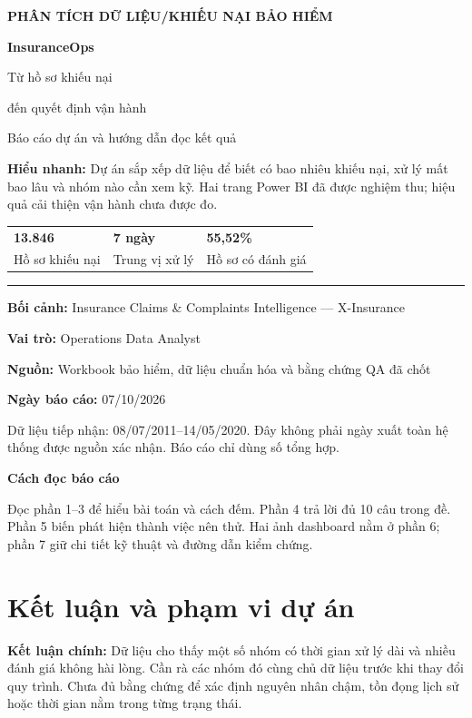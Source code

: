 \documentclass[11pt,a4paper]{article}
\newcommand{\lead}[1]{\begingroup\setlength{\fboxsep}{10pt}\colorbox{mist}{\parbox{\dimexpr\linewidth-20pt\relax}{\color{navy}#1}}\endgroup\par}
\begin{document}
\color{ink}
\begin{titlepage}
\thispagestyle{empty}
{\small\bfseries\color{teal}PHÂN TÍCH DỮ LIỆU\quad /\quad KHIẾU NẠI BẢO HIỂM}
\vspace{24mm}

{\fontsize{34}{39}\selectfont\bfseries\color{navy}InsuranceOps\par}
\vspace{6mm}
{\fontsize{23}{29}\selectfont\color{navy}Từ hồ sơ khiếu nại\par đến quyết định vận hành\par}
\vspace{10mm}
{\large Báo cáo dự án và hướng dẫn đọc kết quả\par}
\vspace{18mm}
\lead{\textbf{Hiểu nhanh:} Dự án sắp xếp dữ liệu để biết có bao nhiêu khiếu nại, xử lý mất bao lâu và nhóm nào cần xem kỹ. Hai trang Power BI đã được nghiệm thu; hiệu quả cải thiện vận hành chưa được đo.}
\vspace{12mm}
\begin{tabularx}{\linewidth}{@{}YYY@{}}
{\Large\bfseries\color{teal}13.846} & {\Large\bfseries\color{teal}7 ngày} & {\Large\bfseries\color{teal}55,52\%}\\
Hồ sơ khiếu nại & Trung vị xử lý & Hồ sơ có đánh giá\\
\end{tabularx}
\vfill
{\color{teal}\rule{\linewidth}{1.2pt}}\par
\textbf{Bối cảnh:} Insurance Claims \& Complaints Intelligence — X-Insurance\par
\textbf{Vai trò:} Operations Data Analyst\par
\textbf{Nguồn:} Workbook bảo hiểm, dữ liệu chuẩn hóa và bằng chứng QA đã chốt\par
\textbf{Ngày báo cáo:} 07/10/2026\par
{\small\color{muted}Dữ liệu tiếp nhận: 08/07/2011–14/05/2020. Đây không phải ngày xuất toàn hệ thống được nguồn xác nhận. Báo cáo chỉ dùng số tổng hợp.}
\end{titlepage}

\tableofcontents
\vfill
\lead{\textbf{Cách đọc báo cáo}\par
Đọc phần 1–3 để hiểu bài toán và cách đếm. Phần 4 trả lời đủ 10 câu trong đề. Phần 5 biến phát hiện thành việc nên thử. Hai ảnh dashboard nằm ở phần 6; phần 7 giữ chi tiết kỹ thuật và đường dẫn kiểm chứng.}
\clearpage

\section{Kết luận và phạm vi dự án}
\lead{\textbf{Kết luận chính:} Dữ liệu cho thấy một số nhóm có thời gian xử lý dài và nhiều đánh giá không hài lòng. Cần rà các nhóm đó cùng chủ dữ liệu trước khi thay đổi quy trình. Chưa đủ bằng chứng để xác định nguyên nhân chậm, tồn đọng lịch sử hoặc thời gian nằm trong từng trạng thái.}
\end{document}
